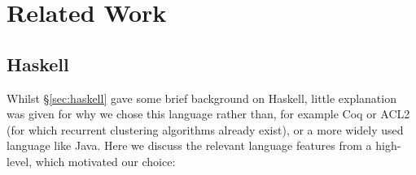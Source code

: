 \section{Related Work}
\label{sec:related}

\subsection{Haskell}
\label{sec:haskelldesc}

Whilst \S \ref{sec:haskell} gave some brief background on Haskell, little explanation was given for why we chose this language rather than, for example Coq or ACL2 (for which recurrent clustering algorithms already exist), or a more widely used language like Java. Here we discuss the relevant language features from a high-level, which motivated our choice:

